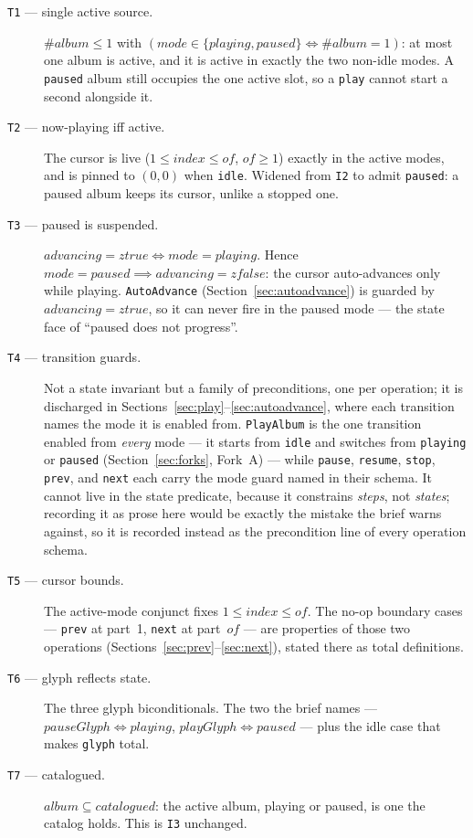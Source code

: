 \documentclass[a4paper,10pt,fleqn]{article}
\begin{document}
\begin{description}
  \item[\texttt{T1} --- single active source.] $\# album \leq 1$ with
    $(mode \in \{ playing, paused \} \iff \# album = 1)$: at most one album is
    active, and it is active in exactly the two non-idle modes. A \texttt{paused}
    album still occupies the one active slot, so a \texttt{play} cannot start a
    second alongside it.
  \item[\texttt{T2} --- now-playing iff active.] The cursor is live
    ($1 \leq index \leq of$, $of \geq 1$) exactly in the active modes, and is
    pinned to $(0,0)$ when \texttt{idle}. Widened from \texttt{I2} to admit
    \texttt{paused}: a paused album keeps its cursor, unlike a stopped one.
  \item[\texttt{T3} --- paused is suspended.] $advancing = ztrue \iff mode =
    playing$. Hence $mode = paused \implies advancing = zfalse$: the cursor
    auto-advances only while playing. \texttt{AutoAdvance}
    (Section~\ref{sec:autoadvance}) is guarded by $advancing = ztrue$, so it can
    never fire in the paused mode --- the state face of ``paused does not
    progress''.
  \item[\texttt{T4} --- transition guards.] Not a state invariant but a family
    of preconditions, one per operation; it is discharged in
    Sections~\ref{sec:play}--\ref{sec:autoadvance}, where each transition names
    the mode it is enabled from. \texttt{PlayAlbum} is the one transition
    enabled from \emph{every} mode --- it starts from \texttt{idle} and switches
    from \texttt{playing} or \texttt{paused} (Section~\ref{sec:forks},
    Fork~A) --- while \texttt{pause}, \texttt{resume}, \texttt{stop},
    \texttt{prev}, and \texttt{next} each carry the mode guard named in their
    schema. It cannot live in the state predicate, because it constrains
    \emph{steps}, not \emph{states}; recording it as prose here would be
    exactly the mistake the brief warns against, so it is recorded instead as
    the precondition line of every operation schema.
  \item[\texttt{T5} --- cursor bounds.] The active-mode conjunct fixes
    $1 \leq index \leq of$. The no-op boundary cases --- \texttt{prev} at part~1,
    \texttt{next} at part~$of$ --- are properties of those two operations
    (Sections~\ref{sec:prev}--\ref{sec:next}), stated there as total
    definitions.
  \item[\texttt{T6} --- glyph reflects state.] The three glyph biconditionals.
    The two the brief names --- $pauseGlyph \iff playing$, $playGlyph \iff
    paused$ --- plus the idle case that makes \texttt{glyph} total.
  \item[\texttt{T7} --- catalogued.] $album \subseteq catalogued$: the active
    album, playing or paused, is one the catalog holds. This is \texttt{I3}
    unchanged.
\end{description}
\end{document}
